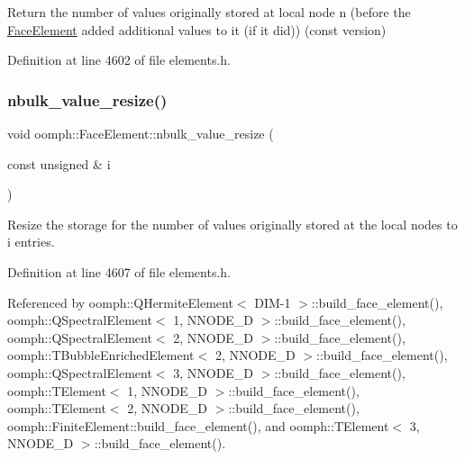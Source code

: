 Return the number of values originally stored at local node n (before the \hyperlink{classoomph_1_1FaceElement}{Face\+Element} added additional values to it (if it did)) (const version) 



Definition at line 4602 of file elements.\+h.

\mbox{\label{classoomph_1_1FaceElement_afd5c80da03ec10df9887e57ee3bce773}} 
\subsubsection{\texorpdfstring{nbulk\+\_\+value\+\_\+resize()}{nbulk\_value\_resize()}}
{\footnotesize\ttfamily void oomph\+::\+Face\+Element\+::nbulk\+\_\+value\+\_\+resize (\begin{DoxyParamCaption}\item[{const unsigned \&}]{i }\end{DoxyParamCaption})\hspace{0.3cm}{\ttfamily [inline]}}



Resize the storage for the number of values originally stored at the local nodes to i entries. 



Definition at line 4607 of file elements.\+h.



Referenced by oomph\+::\+Q\+Hermite\+Element$<$ D\+I\+M-\/1 $>$\+::build\+\_\+face\+\_\+element(), oomph\+::\+Q\+Spectral\+Element$<$ 1, N\+N\+O\+D\+E\+\_\+D $>$\+::build\+\_\+face\+\_\+element(), oomph\+::\+Q\+Spectral\+Element$<$ 2, N\+N\+O\+D\+E\+\_\+D $>$\+::build\+\_\+face\+\_\+element(), oomph\+::\+T\+Bubble\+Enriched\+Element$<$ 2, N\+N\+O\+D\+E\+\_\+D $>$\+::build\+\_\+face\+\_\+element(), oomph\+::\+Q\+Spectral\+Element$<$ 3, N\+N\+O\+D\+E\+\_\+D $>$\+::build\+\_\+face\+\_\+element(), oomph\+::\+T\+Element$<$ 1, N\+N\+O\+D\+E\+\_\+D $>$\+::build\+\_\+face\+\_\+element(), oomph\+::\+T\+Element$<$ 2, N\+N\+O\+D\+E\+\_\+D $>$\+::build\+\_\+face\+\_\+element(), oomph\+::\+Finite\+Element\+::build\+\_\+face\+\_\+element(), and oomph\+::\+T\+Element$<$ 3, N\+N\+O\+D\+E\+\_\+D $>$\+::build\+\_\+face\+\_\+element().

